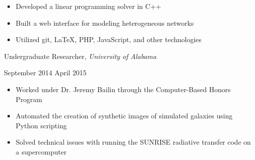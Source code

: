\documentclass[11pt]{article}
\begin{document}
\begin{itemize}
  \item Developed a linear programming solver in C++
  \item Built a web interface for modeling heterogeneous networks
  \item Utilized git, \LaTeX, PHP, JavaScript, and other technologies
\end{itemize}

\vspace{0.4em}
\begin{minipage}[t]{0.7\textwidth}
\flushleft
Undergraduate Researcher, \textit{University of Alabama}\\
\end{minipage}
\begin{minipage}[t]{0.3\textwidth}
\flushright
September 2014 \space \textemdash \space April 2015\\
\end{minipage}

\begin{itemize}
  \item Worked under Dr. Jeremy Bailin through the Computer-Based Honors Program
  \item Automated the creation of synthetic images of simulated galaxies using Python scripting
  \item Solved technical issues with running the SUNRISE radiative transfer code on a supercomputer
\end{itemize}
\end{document}
